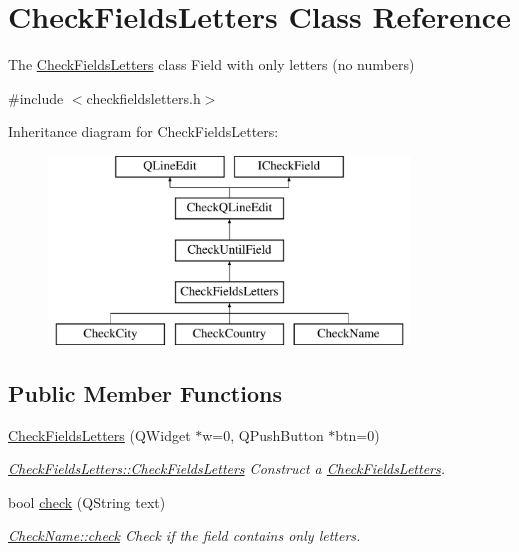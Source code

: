 \hypertarget{classCheckFieldsLetters}{\section{Check\+Fields\+Letters Class Reference}
\label{classCheckFieldsLetters}
}


The \hyperlink{classCheckFieldsLetters}{Check\+Fields\+Letters} class Field with only letters (no numbers)  




{\ttfamily \#include $<$checkfieldsletters.\+h$>$}

Inheritance diagram for Check\+Fields\+Letters\+:\begin{figure}[H]
\begin{center}
\leavevmode
\includegraphics[height=5.000000cm]{de/d19/classCheckFieldsLetters}
\end{center}
\end{figure}
\subsection*{Public Member Functions}
\begin{DoxyCompactItemize}
\item 
\hyperlink{classCheckFieldsLetters_a5a8af8c6e89dc19c7e98304e5f40081d}{Check\+Fields\+Letters} (Q\+Widget $\ast$w=0, Q\+Push\+Button $\ast$btn=0)
\begin{DoxyCompactList}\small\item\em \hyperlink{classCheckFieldsLetters_a5a8af8c6e89dc19c7e98304e5f40081d}{Check\+Fields\+Letters\+::\+Check\+Fields\+Letters} Construct a \hyperlink{classCheckFieldsLetters}{Check\+Fields\+Letters}. \end{DoxyCompactList}\item 
bool \hyperlink{classCheckFieldsLetters_a62574deb407fe83456e46381425a7b46}{check} (Q\+String text)
\begin{DoxyCompactList}\small\item\em \hyperlink{classCheckFieldsLetters_a62574deb407fe83456e46381425a7b46}{Check\+Name\+::check} Check if the field contains only letters. \end{DoxyCompactList}\end{DoxyCompactItemize}
